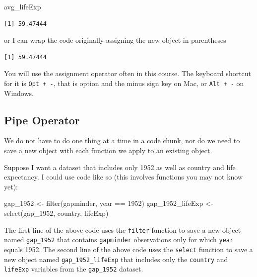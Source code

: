 \documentclass[
]{book}
\makeatletter
\newenvironment{Shaded}{\begin{snugshade}}{\end{snugshade}}
\newcommand{\DecValTok}[1]{\textcolor[rgb]{0.06,0.06,0.06}{#1}}
\newcommand{\FunctionTok}[1]{\textcolor[rgb]{0,0,0}{#1}}
\newcommand{\NormalTok}[1]{#1}
\newcommand{\OtherTok}[1]{\textcolor[rgb]{0.37,0.37,0.37}{#1}}
\newcommand{\SpecialCharTok}[1]{\textcolor[rgb]{0,0,0}{#1}}
\newenvironment{kframe}{%
\medskip{}
\setlength{\fboxsep}{.8em}
 \def\at@end@of@kframe{}%
 \ifinner\ifhmode%
  \def\at@end@of@kframe{\end{minipage}}%
  \begin{minipage}{\columnwidth}%
 \fi\fi%
 \def\FrameCommand##1{\hskip\@totalleftmargin \hskip-\fboxsep
 \colorbox{shadecolor}{##1}\hskip-\fboxsep
     \hskip-\linewidth \hskip-\@totalleftmargin \hskip\columnwidth}%
 \MakeFramed {\advance\hsize-\width
   \@totalleftmargin\z@ \linewidth\hsize
   \@setminipage}}%
 {\par\unskip\endMakeFramed%
 \at@end@of@kframe}
\renewenvironment{Shaded}{\begin{kframe}}{\end{kframe}}
\makeatother
\begin{document}
\begin{Shaded}
\begin{Highlighting}[]
\NormalTok{avg\_lifeExp}
\end{Highlighting}
\end{Shaded}

\begin{verbatim}
[1] 59.47444
\end{verbatim}

or I can wrap the code originally assigning the new object in parentheses

\begin{Shaded}
\end{Shaded}

\begin{verbatim}
[1] 59.47444
\end{verbatim}

You will use the assignment operator often in this course. The keyboard shortcut for it is \texttt{Opt\ +\ -}, that is option and the minus sign key on Mac, or \texttt{Alt\ +\ -} on Windows.

\hypertarget{pipe-operator}{%
\subsection{Pipe Operator}\label{pipe-operator}}

We do not have to do one thing at a time in a code chunk, nor do we need to save a new object with each function we apply to an existing object.

Suppose I want a dataset that includes only 1952 as well as country and life expectancy. I could use code like so (this involves functions you may not know yet):

\begin{Shaded}
\begin{Highlighting}[]
\NormalTok{gap\_1952 }\OtherTok{\textless{}{-}} \FunctionTok{filter}\NormalTok{(gapminder, year }\SpecialCharTok{==} \DecValTok{1952}\NormalTok{)}
\NormalTok{gap\_1952\_lifeExp }\OtherTok{\textless{}{-}} \FunctionTok{select}\NormalTok{(gap\_1952, country, lifeExp)}
\end{Highlighting}
\end{Shaded}

The first line of the above code uses the \texttt{filter} function to save a new object named \texttt{gap\_1952} that contains \texttt{gapminder} observations only for which \texttt{year} equals 1952. The second line of the above code uses the \texttt{select} function to save a new object named \texttt{gap\_1952\_lifeExp} that includes only the \texttt{country} and \texttt{lifeExp} variables from the \texttt{gap\_1952} dataset.
\end{document}
